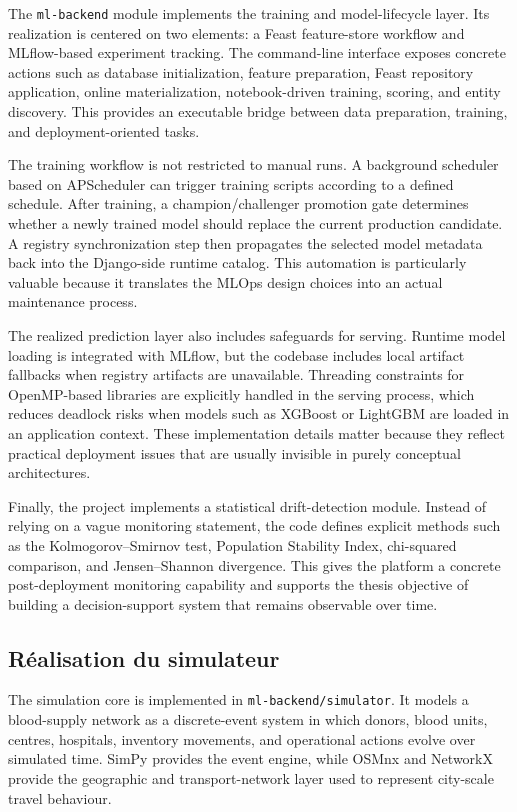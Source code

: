 The \texttt{ml-backend} module implements the training and model-lifecycle layer. Its realization is centered on two elements: a Feast feature-store workflow and MLflow-based experiment tracking. The command-line interface exposes concrete actions such as database initialization, feature preparation, Feast repository application, online materialization, notebook-driven training, scoring, and entity discovery. This provides an executable bridge between data preparation, training, and deployment-oriented tasks.

The training workflow is not restricted to manual runs. A background scheduler based on APScheduler can trigger training scripts according to a defined schedule. After training, a champion/challenger promotion gate determines whether a newly trained model should replace the current production candidate. A registry synchronization step then propagates the selected model metadata back into the Django-side runtime catalog. This automation is particularly valuable because it translates the MLOps design choices into an actual maintenance process.

The realized prediction layer also includes safeguards for serving. Runtime model loading is integrated with MLflow, but the codebase includes local artifact fallbacks when registry artifacts are unavailable. Threading constraints for OpenMP-based libraries are explicitly handled in the serving process, which reduces deadlock risks when models such as XGBoost or LightGBM are loaded in an application context. These implementation details matter because they reflect practical deployment issues that are usually invisible in purely conceptual architectures.

Finally, the project implements a statistical drift-detection module. Instead of relying on a vague monitoring statement, the code defines explicit methods such as the Kolmogorov--Smirnov test, Population Stability Index, chi-squared comparison, and Jensen--Shannon divergence. This gives the platform a concrete post-deployment monitoring capability and supports the thesis objective of building a decision-support system that remains observable over time.

\subsection{Réalisation du simulateur}
\label{sec:simulator-realization}

The simulation core is implemented in \texttt{ml-backend/simulator}. It models a blood-supply network as a discrete-event system in which donors, blood units, centres, hospitals, inventory movements, and operational actions evolve over simulated time. SimPy provides the event engine, while OSMnx and NetworkX provide the geographic and transport-network layer used to represent city-scale travel behaviour.

